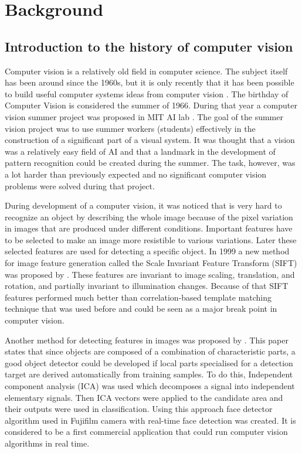 \chapter{Background}

\section{Introduction to the history of computer vision}
\label{sec:intro}


Computer vision is a relatively old field in computer science. The subject itself has been around since the 1960s, but it is only recently that it has been possible to build useful computer systems ideas from computer vision \cite {cv}.
The birthday of Computer Vision is considered the summer of 1966.  During that year a computer vision summer project was proposed in MIT AI lab \citep{papert}. The goal of the summer vision project was to use summer workers (students) effectively in the construction of a significant part of a visual system. It was thought that a vision was a relatively easy field of AI and that a landmark in the development of pattern recognition could be created during the summer. The task, however, was a lot harder than previously expected and no significant computer vision problems were solved during that project.

During development of a computer vision, it was noticed that is very hard to recognize an object by describing the whole image because of the pixel variation in images that are produced under different conditions. Important features have to be selected to make an image more resistible to various variations. Later these selected features are used for detecting a specific object. In 1999 a new method for image feature generation called the Scale Invariant Feature Transform (SIFT) was proposed by \cite{sift}. These features are invariant to image scaling, translation, and rotation, and partially invariant to illumination changes. Because of that SIFT features performed much better than correlation-based template matching technique that was used before and could be seen as a major break point in computer vision.
 
Another method for detecting features in images was proposed by \citep{nakano2006object}. This paper states that since objects are composed of a combination of characteristic parts, a good object detector could be developed if local parts specialised for a detection target are derived automatically from training samples. To do this, Independent component analysis (ICA) was used which decomposes a signal into independent elementary signals. Then ICA vectors were applied to the candidate area and their outputs were used in classification. Using this approach face detector algorithm used in Fujifilm camera with real-time face detection was created. It is considered to be a first commercial application that could run computer vision algorithms in real time. 
 
